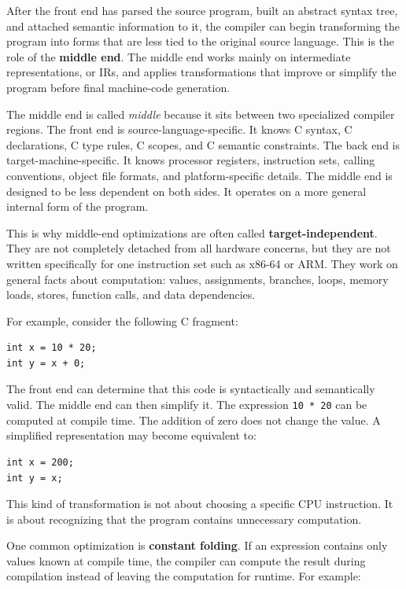 After the front end has parsed the source program, built an abstract syntax tree, and attached semantic information to it, the compiler can begin transforming the program into forms that are less tied to the original source language. This is the role of the \textbf{middle end}. The middle end works mainly on intermediate representations, or IRs, and applies transformations that improve or simplify the program before final machine-code generation.

The middle end is called \emph{middle} because it sits between two specialized compiler regions. The front end is source-language-specific. It knows C syntax, C declarations, C type rules, C scopes, and C semantic constraints. The back end is target-machine-specific. It knows processor registers, instruction sets, calling conventions, object file formats, and platform-specific details. The middle end is designed to be less dependent on both sides. It operates on a more general internal form of the program.

This is why middle-end optimizations are often called \textbf{target-independent}. They are not completely detached from all hardware concerns, but they are not written specifically for one instruction set such as x86-64 or ARM. They work on general facts about computation: values, assignments, branches, loops, memory loads, stores, function calls, and data dependencies.

For example, consider the following C fragment:

\begin{verbatim}
int x = 10 * 20;
int y = x + 0;
\end{verbatim}

The front end can determine that this code is syntactically and semantically valid. The middle end can then simplify it. The expression \texttt{10 * 20} can be computed at compile time. The addition of zero does not change the value. A simplified representation may become equivalent to:

\begin{verbatim}
int x = 200;
int y = x;
\end{verbatim}

This kind of transformation is not about choosing a specific CPU instruction. It is about recognizing that the program contains unnecessary computation.

One common optimization is \textbf{constant folding}. If an expression contains only values known at compile time, the compiler can compute the result during compilation instead of leaving the computation for runtime. For example:

